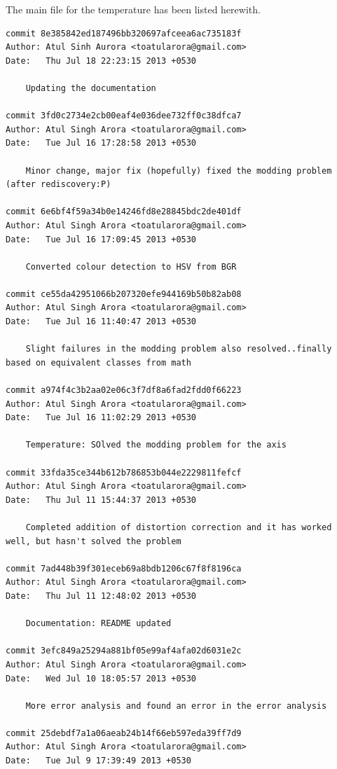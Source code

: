 		\par
		The main file for the temperature has been listed herewith.
		
		\begin{lstlisting}
commit 8e385842ed187496bb320697afceea6ac735183f
Author: Atul Sinh Aurora <toatularora@gmail.com>
Date:   Thu Jul 18 22:23:15 2013 +0530

    Updating the documentation

commit 3fd0c2734e2cb00eaf4e036dee732ff0c38dfca7
Author: Atul Singh Arora <toatularora@gmail.com>
Date:   Tue Jul 16 17:28:58 2013 +0530

    Minor change, major fix (hopefully) fixed the modding problem (after rediscovery:P)

commit 6e6bf4f59a34b0e14246fd8e28845bdc2de401df
Author: Atul Singh Arora <toatularora@gmail.com>
Date:   Tue Jul 16 17:09:45 2013 +0530

    Converted colour detection to HSV from BGR

commit ce55da42951066b207320efe944169b50b82ab08
Author: Atul Singh Arora <toatularora@gmail.com>
Date:   Tue Jul 16 11:40:47 2013 +0530

    Slight failures in the modding problem also resolved..finally based on equivalent classes from math

commit a974f4c3b2aa02e06c3f7df8a6fad2fdd0f66223
Author: Atul Singh Arora <toatularora@gmail.com>
Date:   Tue Jul 16 11:02:29 2013 +0530

    Temperature: SOlved the modding problem for the axis

commit 33fda35ce344b612b786853b044e2229811fefcf
Author: Atul Singh Arora <toatularora@gmail.com>
Date:   Thu Jul 11 15:44:37 2013 +0530

    Completed addition of distortion correction and it has worked well, but hasn't solved the problem

commit 7ad448b39f301eceb69a8bdb1206c67f8f8196ca
Author: Atul Singh Arora <toatularora@gmail.com>
Date:   Thu Jul 11 12:48:02 2013 +0530

    Documentation: README updated

commit 3efc849a25294a881bf05e99af4afa02d6031e2c
Author: Atul Singh Arora <toatularora@gmail.com>
Date:   Wed Jul 10 18:05:57 2013 +0530

    More error analysis and found an error in the error analysis

commit 25debdf7a1a06aeab24b14f66eb597eda39ff7d9
Author: Atul Singh Arora <toatularora@gmail.com>
Date:   Tue Jul 9 17:39:49 2013 +0530


\end{lstlisting}
